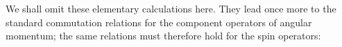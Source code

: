 We shall omit these elementary calculations here. They lead once more to the
standard commutation relations for the component operators of angular momentum;
the same relations must therefore hold for the spin operators:
